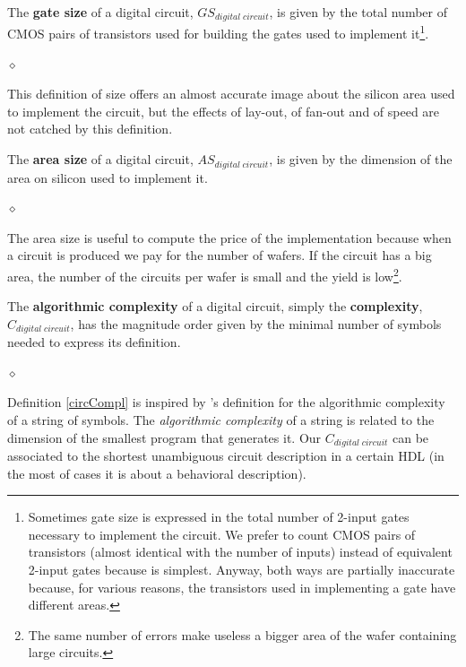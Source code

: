 \begin{definition}
The {\bf gate size} of a digital circuit, $GS_{digital \;
circuit}$, is given by the total number of CMOS pairs of
transistors used for building the gates  used to implement it\footnote{Sometimes gate size
is expressed in the total number of 2-input gates necessary to
implement the circuit. We prefer to count CMOS pairs of
transistors (almost identical with the number of inputs) instead
of equivalent 2-input gates because is simplest. Anyway, both ways
are partially inaccurate because, for various reasons, the
transistors used in implementing a gate have different areas.}.


$\diamond$
\end{definition}

This definition of size offers an almost accurate image about the
silicon area used to implement the circuit, but the effects of
lay-out, of fan-out and of speed are not catched by this
definition.

\begin{definition}
The {\bf area size} of a digital circuit, $AS_{digital \;
circuit}$, is given by the dimension of the area on silicon used
to implement it.

$\diamond$
\end{definition}

The area size is useful to compute the price of the implementation
because when a circuit is produced we pay for the number of
wafers. If the circuit has a big area, the number of the circuits
per wafer is small and the yield is low\footnote{The same number
of errors make useless  a bigger area of the wafer containing
large circuits.}.

\begin{definition}\label{circCompl}
The {\bf algorithmic complexity}  of a  digital circuit, simply
the {\bf complexity}, $C_{digital \; circuit}$, has the magnitude
order given by the minimal number of symbols needed to express its
definition.

$\diamond$
\end{definition}

Definition \ref{circCompl} is inspired by \cite{Chaitin77}'s definition for the
algorithmic complexity of a string of symbols. The
{\em algorithmic complexity} of a string is related to the
dimension of the smallest program that generates it.  Our $C_{digital
\; circuit}$ can be associated to the shortest unambiguous circuit description
in a certain HDL (in the most of cases it is about a behavioral
description).

